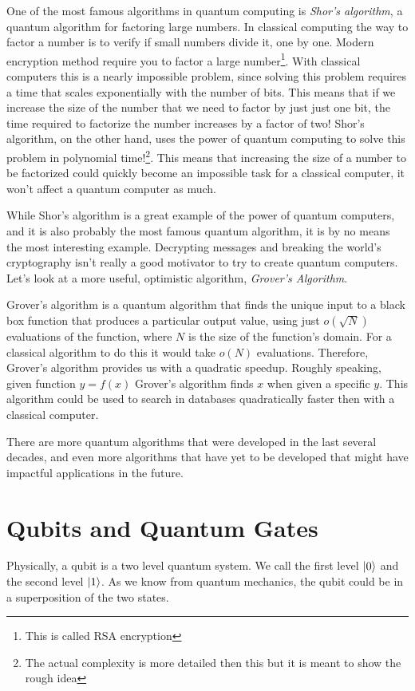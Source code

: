 One of the most famous algorithms in quantum computing is \textit{Shor's algorithm}, a quantum algorithm for factoring large numbers. In classical computing the way to factor a number is to verify if small numbers divide it, one by one. Modern encryption method require you to factor a large number\footnote{This is called RSA encryption}. With classical computers this is a nearly impossible problem, since solving this problem requires a time that scales exponentially with the number of bits. This means that if we increase the size of the number that we need to factor by just just one bit, the time required to factorize the number increases by a factor of two! Shor's algorithm, on the other hand, uses the power of quantum computing to solve this problem in polynomial time!\footnote{The actual complexity is more detailed then this but it is meant to show the rough idea}. This means that increasing the size of a number to be factorized could quickly become an impossible task for a classical computer, it won't affect a quantum computer as much. 

While Shor's algorithm is a great example of the power of quantum computers, and it is also probably the most famous quantum algorithm, it is by no means the most interesting example. Decrypting messages and breaking the world's cryptography isn't really a good motivator to try to create quantum computers. Let's look at a more useful, optimistic algorithm, \textit{Grover's Algorithm}.

Grover's algorithm is a quantum algorithm that finds the unique input to a black box function that produces a particular output value, using just $o(\sqrt {N})$ evaluations of the function, where $N$ is the size of the function's domain. For a classical algorithm to do this it would take $o(N)$ evaluations. Therefore, Grover's algorithm provides us with a quadratic speedup. Roughly speaking, given function $y = f(x)$ Grover's algorithm finds $x$ when given a specific $y$. This algorithm could be used to search in databases quadratically faster then with a classical computer.

There are more quantum algorithms that were developed in the last several decades, and even more algorithms that have yet to be developed that might have impactful applications in the future.

\section{Qubits and Quantum Gates}
Physically, a qubit is a two level quantum system. We call the first level $\ket{0}$ and the second level $\ket{1}$. As we know from quantum mechanics, the qubit could be in a superposition of the two states.


